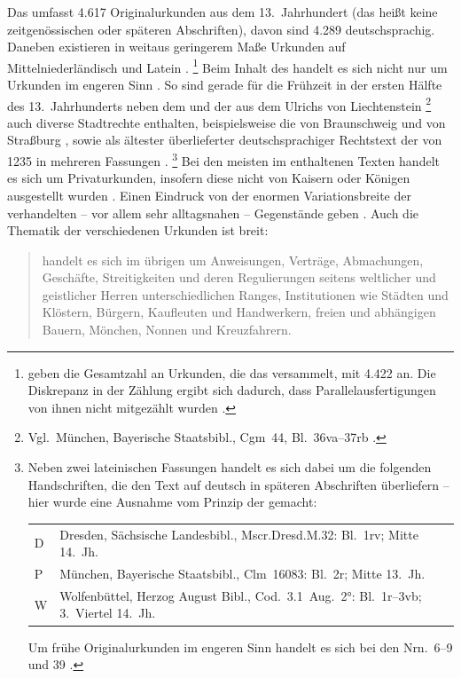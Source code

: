 Das \CAO{} umfasst 4.617 Originalurkunden aus dem 13.\ Jahrhundert
(das heißt keine zeitgenössischen oder späteren Abschriften), davon sind 4.289
deutschsprachig. Daneben existieren in weitaus geringerem Maße Urkunden auf
Mittelniederländisch und Latein
\autocites[\RN{1}]{deboor1976}[25]{schulze2011}[40--41]{ganslmayer2012}.%
%
	\footnote{\citet[391]{gniffkerapp2005} geben die Gesamtzahl an Urkunden,
	die das \CAO{} versammelt, mit 4.422 an. Die Diskrepanz in der
	Zählung ergibt sich dadurch, dass Parallelausfertigungen von ihnen nicht
	mitgezählt wurden
	\autocite[vgl.][40]{ganslmayer2012}.\label{fn:caowordcount}}
%
Beim Inhalt des \CAO{} handelt es sich nicht nur um Urkunden im
engeren Sinn \autocite[596]{schmidtwiegand1998b}. So sind gerade für die
Frühzeit in der ersten Hälfte des 13.~Jahrhunderts neben dem  \autocite[1]{cao1} und der  aus dem
 Ulrichs von Liechtenstein \autocite[3]{cao1}%
%
	\footnote{Vgl.\ München, Bayerische Staatsbibl., Cgm~44, Bl.~36va--37rb{}
	\autocite[1307]{hsc}.}
%
auch diverse Stadtrechte enthalten, beispielsweise die von Braunschweig und von
Straßburg \autocites[2]{cao1}[N~238~AB]{cao5}, sowie als ältester
überlieferter deutschsprachiger Rechtstext der 
von 1235 in mehreren Fassungen \autocite[4]{cao1}.%
%
	\footnote{Neben zwei lateinischen Fassungen \autocite[\ppno~4~Dor,
	4~F]{cao1} handelt es sich dabei um die folgenden Handschriften, die den
	Text auf deutsch in späteren Abschriften überliefern -- hier wurde eine
	Ausnahme vom Prinzip der  gemacht:

	\begin{tabularx}{\linewidth}{@{} l >{\citereset}X @{}}
	D & Dresden, Sächsische Landesbibl., Mscr.Dresd.M.32: Bl.~1rv; Mitte 14.\ Jh.
		\autocite[7549]{hsc}
	\\

	P & München, Bayerische Staatsbibl., Clm~16083: Bl.~2r; Mitte
		13.\ Jh. \autocites[256]{haas2010}[19293]{hsc}
	\\
	W & Wolfenbüttel, Herzog August Bibl., Cod.~3.1~Aug.~2°: Bl.~1r--3vb;
		3.~Viertel 14.~Jh. \autocite[8396]{hsc}
	\\
	\end{tabularx}

	Um frühe Originalurkunden im engeren Sinn handelt es sich bei den
	Nrn.~6--9 und 39 \autocites{cao1}[vgl.][15--16]{bertelsmeierkierst2008}.%
	}
%
Bei den meisten im \CAO{} enthaltenen Texten handelt es sich um
Privaturkunden, insofern diese nicht von Kaisern oder Königen
ausgestellt wurden
\autocites[vgl.][575]{frenz1998a}[585]{frenz1998b}. Einen Eindruck von der
enormen Variationsbreite der verhandelten -- vor allem sehr alltagsnahen --
Gegen\-stände geben \textcites[11]{schulze2011}[35--36]{ganslmayer2012}.
Auch die Thematik der verschiedenen Urkunden ist
breit: \blockcquote[596]{schmidtwiegand1998b}{ handelt es sich im
übrigen um Anweisungen, Verträge, Abmachungen, Geschäfte, Streitigkeiten und
deren Regulierungen seitens weltlicher und geistlicher Herren unterschiedlichen
Ranges, Institutionen wie Städten und Klöstern, Bürgern, Kaufleuten und
Handwerkern, freien und abhängigen Bauern, Mönchen, Nonnen und Kreuzfahrern.}

